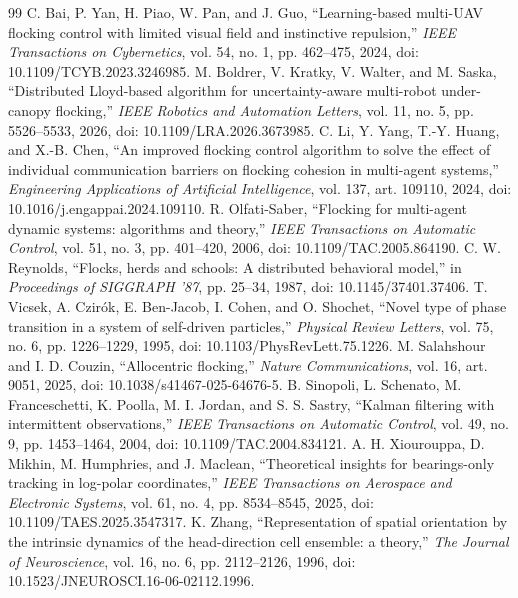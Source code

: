 \documentclass[UTF8,fontset=windows,11pt]{ctexart}
\begin{document}
\begin{thebibliography}{99}
\small
\setlength{\itemsep}{2pt}
 C. Bai, P. Yan, H. Piao, W. Pan, and J. Guo, ``Learning-based multi-UAV flocking control with limited visual field and instinctive repulsion,'' \emph{IEEE Transactions on Cybernetics}, vol. 54, no. 1, pp. 462--475, 2024, doi: 10.1109/TCYB.2023.3246985.
 M. Boldrer, V. Kratky, V. Walter, and M. Saska, ``Distributed Lloyd-based algorithm for uncertainty-aware multi-robot under-canopy flocking,'' \emph{IEEE Robotics and Automation Letters}, vol. 11, no. 5, pp. 5526--5533, 2026, doi: 10.1109/LRA.2026.3673985.
 C. Li, Y. Yang, T.-Y. Huang, and X.-B. Chen, ``An improved flocking control algorithm to solve the effect of individual communication barriers on flocking cohesion in multi-agent systems,'' \emph{Engineering Applications of Artificial Intelligence}, vol. 137, art. 109110, 2024, doi: 10.1016/j.engappai.2024.109110.
 R. Olfati-Saber, ``Flocking for multi-agent dynamic systems: algorithms and theory,'' \emph{IEEE Transactions on Automatic Control}, vol. 51, no. 3, pp. 401--420, 2006, doi: 10.1109/TAC.2005.864190.
 C. W. Reynolds, ``Flocks, herds and schools: A distributed behavioral model,'' in \emph{Proceedings of SIGGRAPH '87}, pp. 25--34, 1987, doi: 10.1145/37401.37406.
 T. Vicsek, A. Czirók, E. Ben-Jacob, I. Cohen, and O. Shochet, ``Novel type of phase transition in a system of self-driven particles,'' \emph{Physical Review Letters}, vol. 75, no. 6, pp. 1226--1229, 1995, doi: 10.1103/PhysRevLett.75.1226.
 M. Salahshour and I. D. Couzin, ``Allocentric flocking,'' \emph{Nature Communications}, vol. 16, art. 9051, 2025, doi: 10.1038/s41467-025-64676-5.
 B. Sinopoli, L. Schenato, M. Franceschetti, K. Poolla, M. I. Jordan, and S. S. Sastry, ``Kalman filtering with intermittent observations,'' \emph{IEEE Transactions on Automatic Control}, vol. 49, no. 9, pp. 1453--1464, 2004, doi: 10.1109/TAC.2004.834121.
 A. H. Xiourouppa, D. Mikhin, M. Humphries, and J. Maclean, ``Theoretical insights for bearings-only tracking in log-polar coordinates,'' \emph{IEEE Transactions on Aerospace and Electronic Systems}, vol. 61, no. 4, pp. 8534--8545, 2025, doi: 10.1109/TAES.2025.3547317.
 K. Zhang, ``Representation of spatial orientation by the intrinsic dynamics of the head-direction cell ensemble: a theory,'' \emph{The Journal of Neuroscience}, vol. 16, no. 6, pp. 2112--2126, 1996, doi: 10.1523/JNEUROSCI.16-06-02112.1996.

\end{thebibliography}
\end{document}
